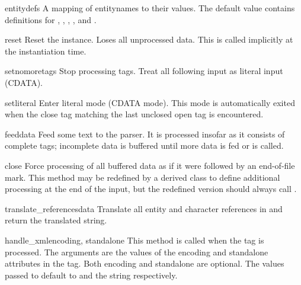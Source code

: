 \begin{memberdesc}{entitydefs}
A mapping of entitynames to their values.  The default value contains
definitions for , , , , 
and .
\end{memberdesc}

\begin{methoddesc}{reset}{}
Reset the instance.  Loses all unprocessed data.  This is called
implicitly at the instantiation time.
\end{methoddesc}

\begin{methoddesc}{setnomoretags}{}
Stop processing tags.  Treat all following input as literal input
(CDATA).
\end{methoddesc}

\begin{methoddesc}{setliteral}{}
Enter literal mode (CDATA mode).  This mode is automatically exited
when the close tag matching the last unclosed open tag is encountered.
\end{methoddesc}

\begin{methoddesc}{feed}{data}
Feed some text to the parser.  It is processed insofar as it consists
of complete tags; incomplete data is buffered until more data is
fed or  is called.
\end{methoddesc}

\begin{methoddesc}{close}{}
Force processing of all buffered data as if it were followed by an
end-of-file mark.  This method may be redefined by a derived class to
define additional processing at the end of the input, but the
redefined version should always call .
\end{methoddesc}

\begin{methoddesc}{translate_references}{data}
Translate all entity and character references in  and
return the translated string.
\end{methoddesc}

\begin{methoddesc}{handle_xml}{encoding, standalone}
This method is called when the  tag is processed.
The arguments are the values of the encoding and standalone attributes 
in the tag.  Both encoding and standalone are optional.  The values
passed to  default to  and the string
 respectively.
\end{methoddesc}

